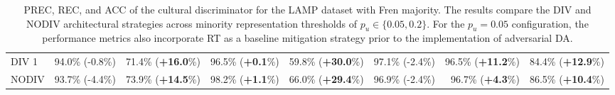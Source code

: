 \begin{table}
\begin{tabular}{lrrrrrrr}
DIV 1           & 94.0\% (-0.8\%) & 71.4\% (\textbf{+16.0}\%) & 96.5\% (\textbf{+0.1}\%) & 59.8\% (\textbf{+30.0}\%) & 97.1\% (-2.4\%) & 96.5\% (\textbf{+11.2}\%) & 84.4\% (\textbf{+12.9}\%) \\
NODIV           & 93.7\% (-4.4\%) & 73.9\% (\textbf{+14.5}\%) & 98.2\% (\textbf{+1.1}\%) & 66.0\% (\textbf{+29.4}\%) & 96.9\% (-2.4\%) & 96.7\% (\textbf{+4.3}\%) & 86.5\% (\textbf{+10.4}\%) \\
\bottomrule
\end{tabular}
\caption{PREC, REC, and ACC of the cultural discriminator for the LAMP dataset with Fren majority. The results compare the DIV and NODIV architectural strategies across minority representation thresholds of $p_u \in \{0.05, 0.2\}$. For the $p_u = 0.05$ configuration, the performance metrics also incorporate RT as a baseline mitigation strategy prior to the implementation of adversarial DA.}
\label{ch3:tab:discr:LF}
\end{table}
%
%
